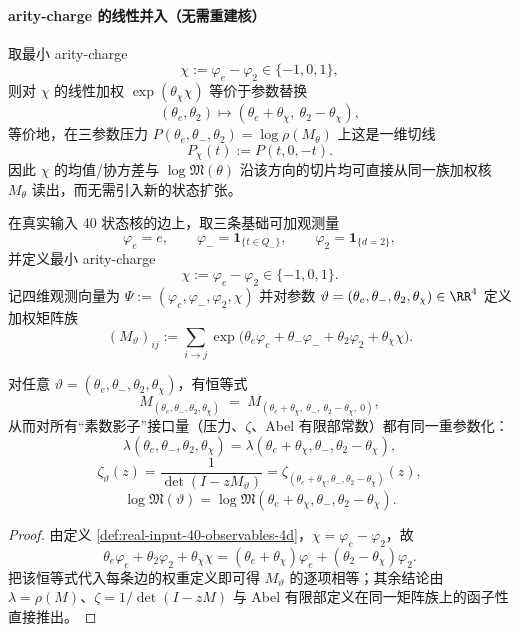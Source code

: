 \paragraph{arity-charge 的线性并入（无需重建核）}
取最小 arity-charge
\[
\chi:=\varphi_e-\varphi_2\in\{-1,0,1\},
\]
则对 $\chi$ 的线性加权 $\exp(\theta_\chi\chi)$ 等价于参数替换
\[
(\theta_e,\theta_2)\mapsto(\theta_e+\theta_\chi,\ \theta_2-\theta_\chi),
\]
等价地，在三参数压力 $P(\theta_e,\theta_-,\theta_2)=\log\rho(M_\theta)$ 上这是一维切线
\[
P_\chi(t):=P(t,0,-t).
\]
因此 $\chi$ 的均值/协方差与 $\log\mathfrak{M}(\theta)$ 沿该方向的切片均可直接从同一族加权核 $M_\theta$ 读出，而无需引入新的状态扩张。

\begin{definition}\label{def:real-input-40-observables-4d}
在真实输入 40 状态核的边上，取三条基础可加观测量
\[
\varphi_e=e,\qquad
\varphi_-=\mathbf{1}_{\{t\in Q_-\}},\qquad
\varphi_2=\mathbf{1}_{\{d=2\}},
\]
并定义最小 arity-charge
\[
\chi:=\varphi_e-\varphi_2\in\{-1,0,1\}.
\]
记四维观测向量为
\(
\Psi:=(\varphi_e,\varphi_-,\varphi_2,\chi)
\)
并对参数 $\vartheta=(\theta_e,\theta_-,\theta_2,\theta_\chi)\in\RR^4$ 定义加权矩阵族
\[
(M_\vartheta)_{ij}:=\sum_{i\to j}\exp\bigl(\theta_e\varphi_e+\theta_-\varphi_-+\theta_2\varphi_2+\theta_\chi\chi\bigr).
\]
\end{definition}

\begin{proposition}\label{prop:chi-reparam-4d}
对任意 $\vartheta=(\theta_e,\theta_-,\theta_2,\theta_\chi)$，有恒等式
\[
M_{(\theta_e,\theta_-,\theta_2,\theta_\chi)}\;=\;M_{(\theta_e+\theta_\chi,\ \theta_-,\ \theta_2-\theta_\chi,\ 0)},
\]
从而对所有“素数影子”接口量（压力、$\zeta$、Abel 有限部常数）都有同一重参数化：
\[
\lambda(\theta_e,\theta_-,\theta_2,\theta_\chi)=\lambda(\theta_e+\theta_\chi,\theta_-,\theta_2-\theta_\chi),
\]
\[
\zeta_{\vartheta}(z)=\frac{1}{\det(I-zM_\vartheta)}=\zeta_{(\theta_e+\theta_\chi,\theta_-,\theta_2-\theta_\chi)}(z),
\]
\[
\log\mathfrak{M}(\vartheta)=\log\mathfrak{M}(\theta_e+\theta_\chi,\theta_-,\theta_2-\theta_\chi).
\]
\end{proposition}

\begin{proof}
由定义 \ref{def:real-input-40-observables-4d}，$\chi=\varphi_e-\varphi_2$，故
\[
\theta_e\varphi_e+\theta_2\varphi_2+\theta_\chi\chi
=(\theta_e+\theta_\chi)\varphi_e+(\theta_2-\theta_\chi)\varphi_2.
\]
把该恒等式代入每条边的权重定义即可得 $M_\vartheta$ 的逐项相等；其余结论由 $\lambda=\rho(M)$、$\zeta=1/\det(I-zM)$ 与 Abel 有限部定义在同一矩阵族上的函子性直接推出。
\end{proof}

